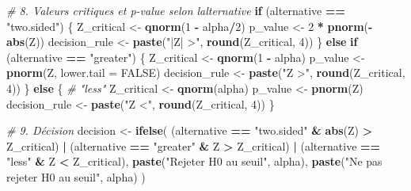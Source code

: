 \documentclass[
  12pt,
]{article}
\newenvironment{Shaded}{\begin{snugshade}}{\end{snugshade}}
\newcommand{\AttributeTok}[1]{\textcolor[rgb]{0.13,0.29,0.53}{#1}}
\newcommand{\CommentTok}[1]{\textcolor[rgb]{0.56,0.35,0.01}{\textit{#1}}}
\newcommand{\ConstantTok}[1]{\textcolor[rgb]{0.56,0.35,0.01}{#1}}
\newcommand{\ControlFlowTok}[1]{\textcolor[rgb]{0.13,0.29,0.53}{\textbf{#1}}}
\newcommand{\DecValTok}[1]{\textcolor[rgb]{0.00,0.00,0.81}{#1}}
\newcommand{\FunctionTok}[1]{\textcolor[rgb]{0.13,0.29,0.53}{\textbf{#1}}}
\newcommand{\NormalTok}[1]{#1}
\newcommand{\OtherTok}[1]{\textcolor[rgb]{0.56,0.35,0.01}{#1}}
\newcommand{\SpecialCharTok}[1]{\textcolor[rgb]{0.81,0.36,0.00}{\textbf{#1}}}
\newcommand{\StringTok}[1]{\textcolor[rgb]{0.31,0.60,0.02}{#1}}
\begin{document}
\begin{Shaded}
\begin{Highlighting}[]
  \CommentTok{\# 8. Valeurs critiques et p{-}value selon l\textquotesingle{}alternative}
  \ControlFlowTok{if}\NormalTok{ (alternative }\SpecialCharTok{==} \StringTok{"two.sided"}\NormalTok{) \{}
\NormalTok{    Z\_critical }\OtherTok{\textless{}{-}} \FunctionTok{qnorm}\NormalTok{(}\DecValTok{1} \SpecialCharTok{{-}}\NormalTok{ alpha}\SpecialCharTok{/}\DecValTok{2}\NormalTok{)}
\NormalTok{    p\_value }\OtherTok{\textless{}{-}} \DecValTok{2} \SpecialCharTok{*} \FunctionTok{pnorm}\NormalTok{(}\SpecialCharTok{{-}}\FunctionTok{abs}\NormalTok{(Z))}
\NormalTok{    decision\_rule }\OtherTok{\textless{}{-}} \FunctionTok{paste}\NormalTok{(}\StringTok{"|Z| \textgreater{}"}\NormalTok{, }\FunctionTok{round}\NormalTok{(Z\_critical, }\DecValTok{4}\NormalTok{))}
\NormalTok{  \} }\ControlFlowTok{else} \ControlFlowTok{if}\NormalTok{ (alternative }\SpecialCharTok{==} \StringTok{"greater"}\NormalTok{) \{}
\NormalTok{    Z\_critical }\OtherTok{\textless{}{-}} \FunctionTok{qnorm}\NormalTok{(}\DecValTok{1} \SpecialCharTok{{-}}\NormalTok{ alpha)}
\NormalTok{    p\_value }\OtherTok{\textless{}{-}} \FunctionTok{pnorm}\NormalTok{(Z, }\AttributeTok{lower.tail =} \ConstantTok{FALSE}\NormalTok{)}
\NormalTok{    decision\_rule }\OtherTok{\textless{}{-}} \FunctionTok{paste}\NormalTok{(}\StringTok{"Z \textgreater{}"}\NormalTok{, }\FunctionTok{round}\NormalTok{(Z\_critical, }\DecValTok{4}\NormalTok{))}
\NormalTok{  \} }\ControlFlowTok{else}\NormalTok{ \{ }\CommentTok{\# "less"}
\NormalTok{    Z\_critical }\OtherTok{\textless{}{-}} \FunctionTok{qnorm}\NormalTok{(alpha)}
\NormalTok{    p\_value }\OtherTok{\textless{}{-}} \FunctionTok{pnorm}\NormalTok{(Z)}
\NormalTok{    decision\_rule }\OtherTok{\textless{}{-}} \FunctionTok{paste}\NormalTok{(}\StringTok{"Z \textless{}"}\NormalTok{, }\FunctionTok{round}\NormalTok{(Z\_critical, }\DecValTok{4}\NormalTok{))}
\NormalTok{  \}}
  
  \CommentTok{\# 9. Décision}
\NormalTok{  decision }\OtherTok{\textless{}{-}} \FunctionTok{ifelse}\NormalTok{(}
\NormalTok{    (alternative }\SpecialCharTok{==} \StringTok{"two.sided"} \SpecialCharTok{\&} \FunctionTok{abs}\NormalTok{(Z) }\SpecialCharTok{\textgreater{}}\NormalTok{ Z\_critical) }\SpecialCharTok{|}
\NormalTok{      (alternative }\SpecialCharTok{==} \StringTok{"greater"} \SpecialCharTok{\&}\NormalTok{ Z }\SpecialCharTok{\textgreater{}}\NormalTok{ Z\_critical) }\SpecialCharTok{|}
\NormalTok{      (alternative }\SpecialCharTok{==} \StringTok{"less"} \SpecialCharTok{\&}\NormalTok{ Z }\SpecialCharTok{\textless{}}\NormalTok{ Z\_critical),}
    \FunctionTok{paste}\NormalTok{(}\StringTok{"Rejeter H0 au seuil"}\NormalTok{, alpha),}
    \FunctionTok{paste}\NormalTok{(}\StringTok{"Ne pas rejeter H0 au seuil"}\NormalTok{, alpha)}
\NormalTok{  )}
  

\end{Highlighting}
\end{Shaded}
\end{document}
